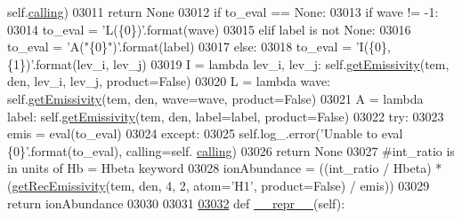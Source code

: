\begin{DoxyCode}
{{{{{{{{{{{{{{{{{{{{{{      self.\hyperlink{classpyneb_1_1core_1_1pynebcore_1_1_rec_atom_a82ec425ebba32b73a5d9ae52717d47c4}{calling})
03011             \textcolor{keywordflow}{return} \textcolor{keywordtype}{None}
03012         \textcolor{keywordflow}{if} to\_eval == \textcolor{keywordtype}{None}:
03013             \textcolor{keywordflow}{if} wave != -1:
03014                 to\_eval = \textcolor{stringliteral}{'L(\{0\})'}.format(wave)
03015             \textcolor{keywordflow}{elif} label \textcolor{keywordflow}{is} \textcolor{keywordflow}{not} \textcolor{keywordtype}{None}:
03016                 to\_eval = \textcolor{stringliteral}{'A("\{0\}")'}.format(label)
03017             \textcolor{keywordflow}{else}:
03018                 to\_eval = \textcolor{stringliteral}{'I(\{0\}, \{1\})'}.format(lev\_i, lev\_j)
03019         I = \textcolor{keyword}{lambda} lev\_i, lev\_j: self.\hyperlink{classpyneb_1_1core_1_1pynebcore_1_1_rec_atom_ac03957666aff1955387fcc03c6187ad3}{getEmissivity}(tem, den, lev\_i, lev\_j, product=\textcolor{keyword}{False})
03020         L = \textcolor{keyword}{lambda} wave: self.\hyperlink{classpyneb_1_1core_1_1pynebcore_1_1_rec_atom_ac03957666aff1955387fcc03c6187ad3}{getEmissivity}(tem, den, wave=wave, product=\textcolor{keyword}{False})
03021         A = \textcolor{keyword}{lambda} label: self.\hyperlink{classpyneb_1_1core_1_1pynebcore_1_1_rec_atom_ac03957666aff1955387fcc03c6187ad3}{getEmissivity}(tem, den, label=label, product=\textcolor{keyword}{False})
03022         \textcolor{keywordflow}{try}:
03023             emis = eval(to\_eval)
03024         \textcolor{keywordflow}{except}:
03025             self.log\_.error(\textcolor{stringliteral}{'Unable to eval \{0\}'}.format(to\_eval), calling=self.
      \hyperlink{classpyneb_1_1core_1_1pynebcore_1_1_rec_atom_a82ec425ebba32b73a5d9ae52717d47c4}{calling})
03026             \textcolor{keywordflow}{return} \textcolor{keywordtype}{None}
03027         \textcolor{comment}{#int\_ratio is in units of Hb = Hbeta keyword}
03028         ionAbundance = ((int\_ratio / Hbeta) * (\hyperlink{namespacepyneb_1_1core_1_1pynebcore_aba9d4a5306330dd47f8a51455514c017}{getRecEmissivity}(tem, den, 4, 2, atom=\textcolor{stringliteral}{'H1'}, 
      product=\textcolor{keyword}{False}) / emis))
03029         \textcolor{keywordflow}{return} ionAbundance
03030     
03031     
\hypertarget{pynebcore_8py_source_l03032}{}\hyperlink{classpyneb_1_1core_1_1pynebcore_1_1_rec_atom_a7bed1e9b39a55269b74b2aeb455b819c}{03032}     \textcolor{keyword}{def }\hyperlink{classpyneb_1_1core_1_1pynebcore_1_1_rec_atom_a7bed1e9b39a55269b74b2aeb455b819c}{\_\_repr\_\_}(self):
}}}}}}}}}}}}}}}}}}}}}}
\end{DoxyCode}
